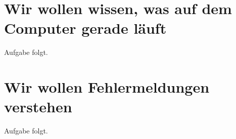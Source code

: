 \chapter{Wir wollen wissen, was auf dem Computer gerade läuft}


\kapitelstruktur

\begin{aufgabeBox}
Aufgabe folgt.
\end{aufgabeBox}


\chapter{Wir wollen Fehlermeldungen verstehen}


\kapitelstruktur

\begin{aufgabeBox}
Aufgabe folgt.
\end{aufgabeBox}


